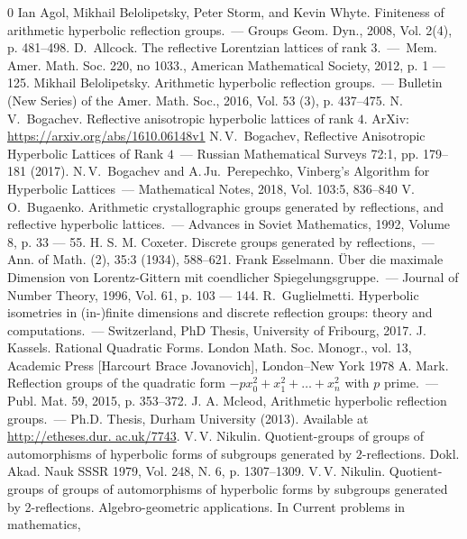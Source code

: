 \documentclass[reqno,12pt]{amsart}
\newcounter{z}
\begin{document}
\begin{thebibliography}{0}
Ian Agol, Mikhail Belolipetsky, Peter Storm, and Kevin Whyte. 
Finiteness of arithmetic hyperbolic reflection groups.~--- Groups Geom. Dyn., 2008, Vol. 2(4), p. 
481--498.
D.~Allcock.  The reflective Lorentzian lattices of rank $3$.~---~Mem. Amer. Math. Soc. 220, 
no 1033., American Mathematical Society, 2012, p. 1 --- 125.
Mikhail Belolipetsky.
Arithmetic hyperbolic reflection groups.~--- Bulletin (New Series) of the Amer. Math. Soc., 
2016, Vol. 53 (3),  p. 437--475.
N.\,V.~Bogachev. Reflective anisotropic hyperbolic lattices of rank $4$. 
ArXiv: \url{https://arxiv.org/abs/1610.06148v1}
 N.\,V.~Bogachev, Reflective Anisotropic Hyperbolic Lattices of Rank $4$~---
Russian Mathematical Surveys 72:1, pp. 179--181 (2017).
N.\,V.~Bogachev and A.\,Ju.~Perepechko, Vinberg's Algorithm for Hyperbolic Lattices~--- Mathematical Notes, 2018, Vol. 103:5, 836--840
V.\,O.~Bugaenko. Arithmetic crystallographic groups generated by reflections, and reflective 
hyperbolic lattices.~--- Advances in Soviet Mathematics, 1992, Volume 8, p. 33 --- 55.
H. S. M. Coxeter. Discrete groups generated by reflections,~--- Ann. of Math. (2), 35:3 (1934), 
588--621.
Frank Esselmann. Über die maximale Dimension von Lorentz-Gittern mit coendlicher 
Spiegelungsgruppe.~--- Journal of Number Theory, 1996, Vol. 61, p. 103 --- 144.
 R.~Guglielmetti. 
Hyperbolic isometries in (in-)finite dimensions and discrete reflection groups: theory and 
computations.~--- Switzerland, PhD Thesis, University of Fribourg, 2017.
J. Kassels. Rational Quadratic Forms. London Math. Soc. Monogr., vol. 13, Academic Press [Harcourt Brace Jovanovich], London–New York 1978
A. Mark. Reflection groups of the quadratic form $- p x_0^2 + x_1^2 + \ldots + x_n^2$ 
with $p$ prime.~--- Publ. Mat. 59, 2015, p. 353--372.
J. A. Mcleod, Arithmetic hyperbolic reflection groups.~--- Ph.D. Thesis, Durham University 
(2013). Available at \url{http://etheses.dur. ac.uk/7743}.
V.\,V. Nikulin. Quotient-groups of groups of automorphisms of hyperbolic forms of subgroups
generated by $2$-reflections. Dokl. Akad. Nauk SSSR 1979, Vol. 248, N. 6, p. 1307--1309.
V.\,V. Nikulin. Quotient-groups of groups of automorphisms of hyperbolic forms by subgroups 
generated by 2-reflections. Algebro-geometric applications. In Current problems in mathematics, 

\end{thebibliography}
\end{document}
